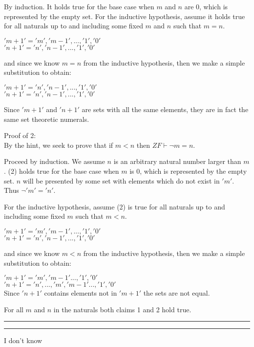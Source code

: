 \documentclass[11pt,letterpaper]{article}
\newcommand{\question}[1] {\vspace{.25in} \hrule\vspace{0.5em}
\noindent{\bf #1} \vspace{0.5em}
\hrule \vspace{.10in}}
\begin{document}
By induction. It holds true for the base case when $m$ and $n$ are 0, which
is represented by the empty set. For the inductive hypothesis, assume it holds
true for all naturals up to and including some fixed $m$ and $n$ such that $m = n$.

$'m+1' = {'m','m-1', ..., '1', '0'}$\\
$'n+1' = {'n','n-1', ..., '1', '0'}$

and since we know $m=n$ from the inductive hypothesis, then we make a simple substitution to obtain:

$'m+1' = {'n','n-1', ..., '1', '0'}$\\
$'n+1' = {'n','n-1', ..., '1', '0'}$

Since $'m+1'$ and $'n+1'$ are sets with all the same elements, they are in fact the same set theoretic numerals.

Proof of 2:\\

By the hint, we seek to prove that if $m<n$ then $ZF \vdash \neg m = n$.

Proceed by induction.
We assume $n$ is an arbitrary natural number larger than $m$.
(2) holds true for the base case when $m$ is 0, which
is represented by the empty set. $n$ will be presented by some set with elements which do not exist in $'m'$. Thus $\neg 'm' = 'n'$.

For the inductive hypothesis, assume (2) is true for all naturals up to and including some fixed $m$ such that $m < n$.

$'m+1' = {'m','m-1', ..., '1', '0'}$\\
$'n+1' = {'n','n-1', ..., '1', '0'}$

and since we know $m<n$ from the inductive hypothesis, then we make a simple substitution to obtain:

$'m+1' = {'m','m-1' ..., '1', '0'}$\\
$'n+1' = {'n',...,'m','m-1' ..., '1', '0'}$\\

Since $'n+1'$ contains elements not in $'m+1'$ the sets are not equal.

For all $m$ and $n$ in the naturals both claims 1 and 2 hold true.


\question{4}
I don't know
\end{document}
